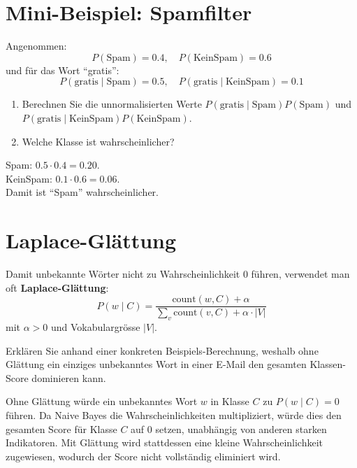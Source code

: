 \section{Mini-Beispiel: Spamfilter}

\begin{myexercise}
Angenommen:
\[
P(\text{Spam})=0.4,\quad P(\text{KeinSpam})=0.6
\]
und für das Wort \enquote{gratis}:
\[
P(\text{gratis}\mid\text{Spam})=0.5,\quad
P(\text{gratis}\mid\text{KeinSpam})=0.1
\]

\begin{enumerate}
    \item Berechnen Sie die unnormalisierten Werte
          $P(\text{gratis}\mid\text{Spam})P(\text{Spam})$ und
          $P(\text{gratis}\mid\text{KeinSpam})P(\text{KeinSpam})$.
    \item Welche Klasse ist wahrscheinlicher?
\end{enumerate}
\begin{myanswer}
Spam: $0.5\cdot0.4=0.20$. \\
KeinSpam: $0.1\cdot0.6=0.06$. \\
Damit ist \enquote{Spam} wahrscheinlicher.
\end{myanswer}
\end{myexercise}

\section{Laplace-Glättung}

\begin{mydefinition}[Smoothing]
Damit unbekannte Wörter nicht zu Wahrscheinlichkeit 0 führen,
verwendet man oft \textbf{Laplace-Glättung}:
\[
P(w\mid C)=\frac{\text{count}(w,C)+\alpha}{\sum_v \text{count}(v,C)+\alpha\cdot |V|}
\]
mit $\alpha>0$ und Vokabulargrösse $|V|$.
\end{mydefinition}

\begin{myexercise}
Erklären Sie anhand einer konkreten Beispiels-Berechnung, weshalb ohne Glättung ein einziges unbekanntes Wort
in einer E-Mail den gesamten Klassen-Score dominieren kann.
\begin{myanswer}
Ohne Glättung würde ein unbekanntes Wort $w$ in Klasse $C$ zu $P(w\mid C)=0$ führen. Da Naive Bayes die Wahrscheinlichkeiten multipliziert, würde dies den gesamten Score für Klasse $C$ auf 0 setzen, unabhängig von anderen starken Indikatoren. Mit Glättung wird stattdessen eine kleine Wahrscheinlichkeit zugewiesen, wodurch der Score nicht vollständig eliminiert wird.
\end{myanswer}
\end{myexercise}

